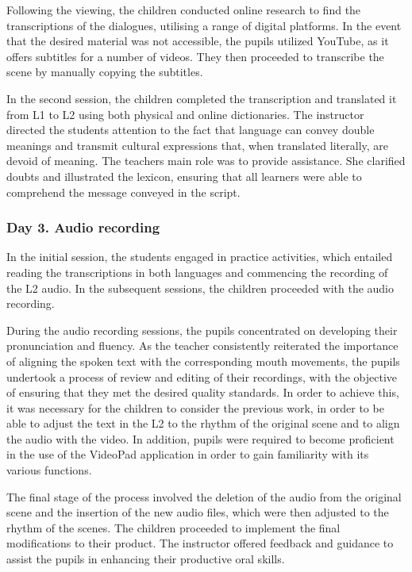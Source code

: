Following the viewing, the children conducted online research to find
the transcriptions of the dialogues, utilising a range of digital
platforms. In the event that the desired material was not accessible,
the pupils utilized YouTube, as it offers subtitles for a number of
videos. They then proceeded to transcribe the scene by manually copying
the subtitles.

In the second session, the children completed the transcription and
translated it from L1 to L2 using both physical and online dictionaries.
The instructor directed the students\textquotesingle{} attention to the
fact that language can convey double meanings and transmit cultural
expressions that, when translated literally, are devoid of meaning. The
teacher\textquotesingle s main role was to provide assistance. She
clarified doubts and illustrated the lexicon, ensuring that all learners
were able to comprehend the message conveyed in the script.

\subsubsection{Day 3. Audio recording}

In the initial session, the students engaged in practice activities,
which entailed reading the transcriptions in both languages and
commencing the recording of the L2 audio. In the subsequent sessions,
the children proceeded with the audio recording.

During the audio recording sessions, the pupils concentrated on
developing their pronunciation and fluency. As the teacher consistently
reiterated the importance of aligning the spoken text with the
corresponding mouth movements, the pupils undertook a process of review
and editing of their recordings, with the objective of ensuring that
they met the desired quality standards. In order to achieve this, it was
necessary for the children to consider the previous work, in order to be
able to adjust the text in the L2 to the rhythm of the original scene
and to align the audio with the video. In addition, pupils were required
to become proficient in the use of the VideoPad application in order to
gain familiarity with its various functions.

The final stage of the process involved the deletion of the audio from
the original scene and the insertion of the new audio files, which were
then adjusted to the rhythm of the scenes. The children proceeded to
implement the final modifications to their product. The instructor
offered feedback and guidance to assist the pupils in enhancing their
productive oral skills.

